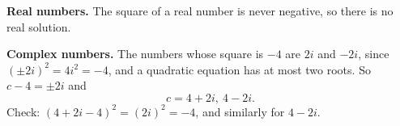 \textbf{Real numbers.} The square of a real number is never negative, so there is no real solution.

\textbf{Complex numbers.} The numbers whose square is $-4$ are $2i$ and $-2i$, since $(\pm2i)^2=4i^2=-4$, and a quadratic equation has at most two roots. So $c-4=\pm2i$ and
\[
c=\boxed{4+2i,\ 4-2i}.
\]
Check: $(4+2i-4)^2=(2i)^2=-4$, and similarly for $4-2i$.
